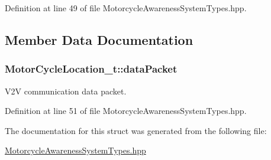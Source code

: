 Definition at line 49 of file Motorcycle\-Awareness\-System\-Types.\-hpp.



\subsection{Member Data Documentation}
\hypertarget{structMotorCycleLocation__t_a1f854587b19dbe91dffd637ce70be62e}{
\subsubsection[{data\-Packet}]{ Motor\-Cycle\-Location\-\_\-t\-::data\-Packet}}\label{structMotorCycleLocation__t_a1f854587b19dbe91dffd637ce70be62e}


V2\-V communication data packet. 



Definition at line 51 of file Motorcycle\-Awareness\-System\-Types.\-hpp.



The documentation for this struct was generated from the following file\-:\begin{DoxyCompactItemize}
\item 
\hyperlink{MotorcycleAwarenessSystemTypes_8hpp}{Motorcycle\-Awareness\-System\-Types.\-hpp}\end{DoxyCompactItemize}
